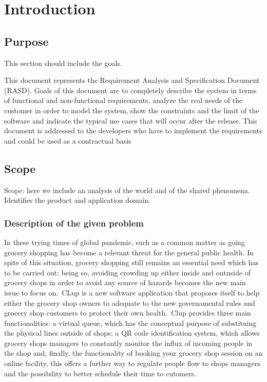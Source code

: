 \section{Introduction}
\label{sect:introduction}

\subsection{Purpose}
\label{subsect:purpose}

This section should include the goals.

This document represents the Requirement Analysis and Specification Document (RASD). Goals of this document are to completely describe the system in terms of functional and non-functional requirements, analyze the real needs of the customer in order to model the system, show the constraints and the limit of the software and indicate the typical use cases that will occur after the release. This document is addressed to the developers who have to implement the requirements and could be used as a contractual basis

\subsection{Scope}
\label{subsect:scope}

Scope: here we include an analysis of the world and of the shared phenomena. Identifies the product and application domain.

\subsubsection{Description of the given problem}
\label{subsect:descriptionofthegivenproblem}

In these trying times of global pandemic, such as a common matter as going grocery shopping has become a relevant threat for the general public health. In spite of this situation, grocery shopping still remains an essential need which has to be carried out: being so, avoiding crowding up either inside and outnside of grocery shops in order to avoid any source of hazards becomes the new main issue to focus on.\ CLup is a new software application that proposes itself to help either the grocery shop owners to adequate to the new governamental rules and grocery shop customers to protect their own health.\ Clup provides three main functionalities: a virtual queue, which has the conceptual purpose of substituing the physical lines outside of shops; a QR code identification system, which allows grocery shops managers to constantly monitor the influx of incoming people in the shop and, finally, the functionality of booking your grocery shop session on an online facility, this offers a further way to regulate people flow to shops managers and the possibility to better schedule their time to cutomers.

